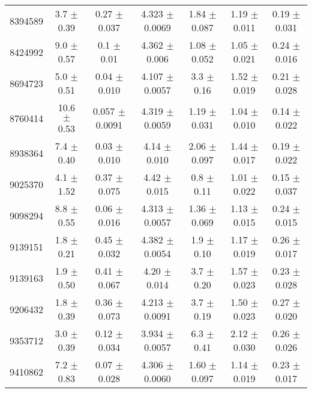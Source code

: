 \begin{table*}
\begin{tabular}{c|cccccc}
8394589  &        3.7    $\pm$  0.39   &      0.27   $\pm$  0.037  &      4.323  $\pm$  0.0069 &      1.84   $\pm$  0.087  &      1.19   $\pm$  0.011  &      0.19   $\pm$  0.031    \\
8424992  &        9.0    $\pm$  0.57   &      0.1    $\pm$  0.01   &      4.362  $\pm$  0.006  &      1.08   $\pm$  0.052  &      1.05   $\pm$  0.021  &      0.24   $\pm$  0.016    \\
8694723  &        5.0    $\pm$  0.51   &      0.04   $\pm$  0.010  &      4.107  $\pm$  0.0057 &      3.3    $\pm$  0.16   &      1.52   $\pm$  0.019  &      0.21   $\pm$  0.028    \\
8760414  &       10.6    $\pm$  0.53   &      0.057  $\pm$  0.0091 &      4.319  $\pm$  0.0059 &      1.19   $\pm$  0.031  &      1.04   $\pm$  0.010  &      0.14   $\pm$  0.022    \\
8938364  &        7.4    $\pm$  0.40   &      0.03   $\pm$  0.010  &      4.14   $\pm$  0.010  &      2.06   $\pm$  0.097  &      1.44   $\pm$  0.017  &      0.19   $\pm$  0.022    \\
9025370  &        4.1    $\pm$  1.52   &      0.37   $\pm$  0.075  &      4.42   $\pm$  0.015  &      0.8    $\pm$  0.11   &      1.01   $\pm$  0.022  &      0.15   $\pm$  0.037    \\
9098294  &        8.8    $\pm$  0.55   &      0.06   $\pm$  0.016  &      4.313  $\pm$  0.0057 &      1.36   $\pm$  0.069  &      1.13   $\pm$  0.015  &      0.24   $\pm$  0.015    \\
9139151  &        1.8    $\pm$  0.21   &      0.45   $\pm$  0.032  &      4.382  $\pm$  0.0054 &      1.9    $\pm$  0.10   &      1.17   $\pm$  0.019  &      0.26   $\pm$  0.017    \\
9139163  &        1.9    $\pm$  0.50   &      0.41   $\pm$  0.067  &      4.20   $\pm$  0.014  &      3.7    $\pm$  0.20   &      1.57   $\pm$  0.023  &      0.23   $\pm$  0.028    \\
9206432  &        1.8    $\pm$  0.39   &      0.36   $\pm$  0.073  &      4.213  $\pm$  0.0091 &      3.7    $\pm$  0.19   &      1.50   $\pm$  0.023  &      0.27   $\pm$  0.020    \\
9353712  &        3.0    $\pm$  0.39   &      0.12   $\pm$  0.034  &      3.934  $\pm$  0.0057 &      6.3    $\pm$  0.41   &      2.12   $\pm$  0.030  &      0.26   $\pm$  0.026    \\
9410862  &        7.2    $\pm$  0.83   &      0.07   $\pm$  0.028  &      4.306  $\pm$  0.0060 &      1.60   $\pm$  0.097  &      1.14   $\pm$  0.019  &      0.23   $\pm$  0.017    \\

\end{tabular}
\end{table*}
